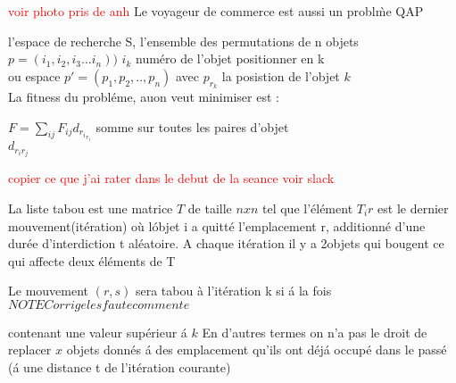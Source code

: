  \textcolor{red}{voir photo pris de anh}
Le voyageur de commerce est aussi un probl\`me QAP

l'espace de recherche S, l'ensemble des permutations de n objets \\
$p=(i_1,i_2,i_3...i_n))$ $i_k$ num\'ero de l'objet positionner en k\\
ou espace $p'=(p_1,p_2,..,p_n)$ avec $p_{r_k}$ la posistion de l'objet $k$\\
La fitness du probl\'eme, auon veut minimiser est :
\begin{center}
$F=\sum_{ij} F_{ij} d_{{r_i}_{r_i}} $
somme sur toutes les paires d'objet \\
$d_{{{r}_{i}}{{r}_{j}}}$

\textcolor{red}{copier ce que j'ai rater dans le debut de la seance voir slack}
\end{center}

La liste tabou est une matrice $T$ de taille $nxn$ tel que l'\'el\'ement $T_ir$ est le dernier mouvement(it\'eration) o\`u l\'objet i a quitt\'e l'emplacement r, additionn\'e d'une dur\'ee d'interdiction t al\'eatoire.
A chaque it\'eration il y a 2objets qui bougent ce qui affecte deux \'el\'ements de T

Le mouvement $(r,s)$ sera tabou \`a l'it\'eration k si \'a la fois  $NOTE Corrige les faute commente $

contenant une valeur sup\'erieur \'a $k$
En d'autres termes on n'a pas le droit de replacer $x$ objets donn\'es \'a des emplacement qu'ils ont d\'ej\'a occup\'e dans le pass\'e  (\'a une distance t de l'it\'eration courante)
\newpage
